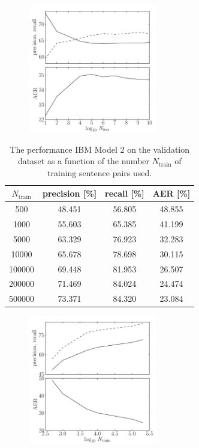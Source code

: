 \documentclass[11pt]{article}
\newcommand{\figlabel}[1]{\label{fig:#1}}
\begin{document}
\begin{figure}[htbp]
\begin{center}
    \includegraphics[width=0.5\textwidth]{model1_convergence.pdf}
\end{center}
\caption{%
\figlabel{model1-convergence}}
\end{figure}

\begin{table}[htbp]
\begin{center}
\begin{tabular}{c ccc}
\toprule
$N_\mathrm{train}$ & precision [\%] & recall [\%] & AER [\%] \\\midrule
500 & 48.451 & 56.805 & 48.855 \\
1000 & 55.603 & 65.385 & 41.199 \\
5000 & 63.329 & 76.923 & 32.283 \\
10000 & 65.678 & 78.698 & 30.115 \\
100000 & 69.448 & 81.953 & 26.507 \\
200000 & 71.469 & 84.024 & 24.474 \\
500000 & 73.371 & 84.320 & 23.084 \\
\bottomrule
\end{tabular}
\end{center}
\caption{%
The performance IBM Model 2 on the validation dataset
as a function of the number $N_\mathrm{train}$ of training sentence pairs used.
\label{tab:model2}}
\end{table}

\begin{figure}[htbp]
\begin{center}
    \includegraphics[width=0.5\textwidth]{model2.pdf}
\end{center}
\caption{%
\figlabel{model2}}
\end{figure}
\end{document}

